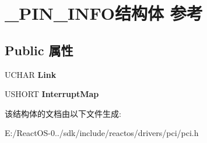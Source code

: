 \hypertarget{struct___p_i_n___i_n_f_o}{}\section{\+\_\+\+P\+I\+N\+\_\+\+I\+N\+F\+O结构体 参考}
\label{struct___p_i_n___i_n_f_o}
\subsection*{Public 属性}
\begin{DoxyCompactItemize}
\item 
\mbox{\label{struct___p_i_n___i_n_f_o_a582afa0dc013300e147e0a90577d223f}} 
U\+C\+H\+AR {\bfseries Link}
\item 
\mbox{\label{struct___p_i_n___i_n_f_o_ab11638a8d2b56f5df21f38c2695aacef}} 
U\+S\+H\+O\+RT {\bfseries Interrupt\+Map}
\end{DoxyCompactItemize}


该结构体的文档由以下文件生成\+:\begin{DoxyCompactItemize}
\item 
E\+:/\+React\+O\+S-\/0../sdk/include/reactos/drivers/pci/pci.\+h\end{DoxyCompactItemize}

